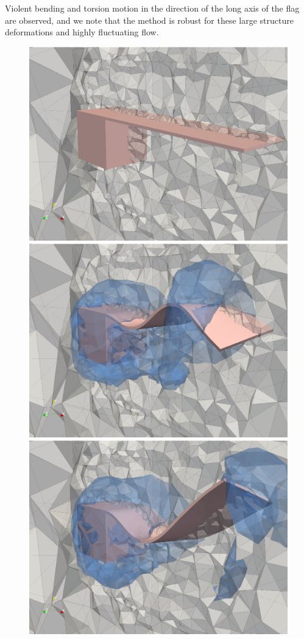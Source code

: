 Violent bending and torsion motion in the direction of the long axis
of the flag are observed, and we note that the method is robust for
these large structure deformations and highly fluctuating flow.

\begin{figure}
  \centering
  \includegraphics[width=\twofigs]{chapters/hoffman-1/png/cube000.png}
  \includegraphics[width=\twofigs]{chapters/hoffman-1/png/cube115.png}\\
  \includegraphics[width=\twofigs]{chapters/hoffman-1/png/cube125.png}

\end{figure}
